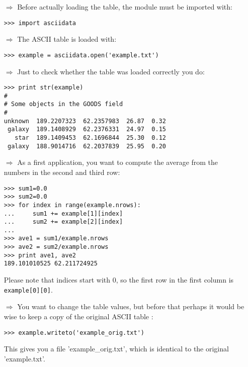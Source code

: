 \begin{itemize}
\item[$\Rightarrow$] Before actually loading the table, the \AAD module
must be imported with:
\begin{verbatim}
>>> import asciidata
\end{verbatim}

\item[$\Rightarrow$] The ASCII table is loaded with:
\begin{verbatim}
>>> example = asciidata.open('example.txt')
\end{verbatim}

\item[$\Rightarrow$] Just to check whether the table was loaded
correctly you do:
\begin{verbatim}
>>> print str(example)
#
# Some objects in the GOODS field
#
unknown  189.2207323  62.2357983  26.87  0.32
 galaxy  189.1408929  62.2376331  24.97  0.15
   star  189.1409453  62.1696844  25.30  0.12
 galaxy  188.9014716  62.2037839  25.95  0.20
\end{verbatim}

\item[$\Rightarrow$] As a first application, you want to compute the average
from the numbers in the second and third row:
\begin{verbatim}
>>> sum1=0.0
>>> sum2=0.0
>>> for index in range(example.nrows):
...     sum1 += example[1][index]
...     sum2 += example[2][index]
... 
>>> ave1 = sum1/example.nrows
>>> ave2 = sum2/example.nrows
>>> print ave1, ave2
189.101010525 62.211724925
\end{verbatim}
Please note that indices start with 0, so the first
row in the first column is \verb+example[0][0]+.

\item[$\Rightarrow$]
You want to change the table values, but before that perhaps it would be
wise to keep a copy of the original ASCII table
:
\begin{verbatim}
>>> example.writeto('example_orig.txt')
\end{verbatim}
This gives you a file 'example\_orig.txt', which is identical
to the original 'example.txt'.


\end{itemize}
